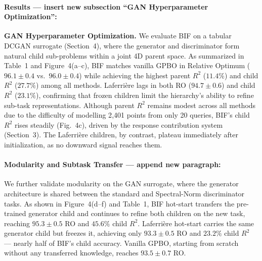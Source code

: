 \paragraph{Results --- insert new subsection ``GAN Hyperparameter Optimization'':}

\textbf{GAN Hyperparameter Optimization.}
We evaluate BIF on a tabular DCGAN surrogate (Section~4),
where the generator and discriminator form natural child sub-problems
within a joint 4D parent space.
As summarized in Table~1 and Figure~4(a--c), BIF matches vanilla
GPBO in Relative Optimum ($96.1 \pm 0.4$ vs.\ $96.0 \pm 0.4$) while
achieving the highest parent $R^2$ ($11.4\%$) and child $R^2$ ($27.7\%$)
among all methods.
Laferri\`ere lags in both RO ($94.7 \pm 0.6$) and child $R^2$ ($23.1\%$),
confirming that frozen children limit the hierarchy's ability to
refine sub-task representations.
Although parent $R^2$ remains modest across all methods due to the
difficulty of modelling 2{,}401 points from only 20 queries,
BIF's child $R^2$ rises steadily (Fig.~4c),
driven by the response contribution system (Section~3).
The Laferri\`ere children, by contrast, plateau immediately after
initialization, as no downward signal reaches them.



\paragraph{Modularity and Subtask Transfer --- append new paragraph:}

We further validate modularity on the GAN surrogate, where the generator
architecture is shared between the standard and Spectral-Norm
discriminator tasks.
As shown in Figure~4(d--f) and Table~1, BIF hot-start transfers
the pre-trained generator child and continues to refine both children
on the new task, reaching $95.3 \pm 0.5$ RO and $45.6\%$ child $R^2$.
Laferri\`ere hot-start carries the same generator child but freezes it,
achieving only $93.3 \pm 0.5$ RO and $23.2\%$ child $R^2$ ---
nearly half of BIF's child accuracy.
Vanilla GPBO, starting from scratch without any transferred knowledge,
reaches $93.5 \pm 0.7$ RO.


